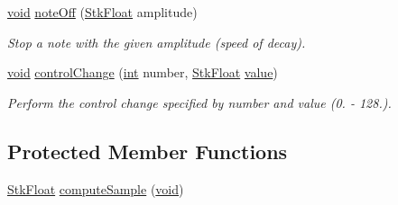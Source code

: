 \begin{DoxyCompactItemize}
\hyperlink{sound_8c_ae35f5844602719cf66324f4de2a658b3}{void} \hyperlink{class_nyq_1_1_banded_w_g_ad6931711ed13894ad95d0ceafab9086f}{note\+Off} (\hyperlink{namespace_nyq_a044fa20a706520a617bbbf458a7db7e4}{Stk\+Float} amplitude)
\begin{DoxyCompactList}\small\item\em Stop a note with the given amplitude (speed of decay). \end{DoxyCompactList}\item 
\hyperlink{sound_8c_ae35f5844602719cf66324f4de2a658b3}{void} \hyperlink{class_nyq_1_1_banded_w_g_a794b7ab5e87e09ff23b503362acea8e6}{control\+Change} (\hyperlink{xmltok_8h_a5a0d4a5641ce434f1d23533f2b2e6653}{int} number, \hyperlink{namespace_nyq_a044fa20a706520a617bbbf458a7db7e4}{Stk\+Float} \hyperlink{lib_2expat_8h_a4a30a13b813682e68c5b689b45c65971}{value})
\begin{DoxyCompactList}\small\item\em Perform the control change specified by {\itshape number} and {\itshape value} (0. -\/ 128.). \end{DoxyCompactList}\end{DoxyCompactItemize}
\subsection*{Protected Member Functions}
\begin{DoxyCompactItemize}
\item 
\hyperlink{namespace_nyq_a044fa20a706520a617bbbf458a7db7e4}{Stk\+Float} \hyperlink{class_nyq_1_1_banded_w_g_aab658c941a8cba5f4075db5234b42924}{compute\+Sample} (\hyperlink{sound_8c_ae35f5844602719cf66324f4de2a658b3}{void})
\end{DoxyCompactItemize}
